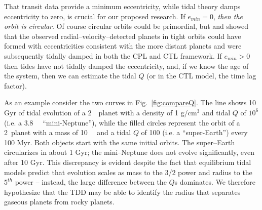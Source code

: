 \medskip
{\centerline{}}
\smallskip

That transit data provide a minimum eccentricity, while tidal theory
damps eccentricity to zero, is crucial for our proposed research. If
$e_{min} = 0$, \textit{then the orbit is circular}.  Of course
circular orbits could be primordial, but \cite{Jackson08}
and \cite{Matsumura10} showed that the observed
radial--velocity--detected planets in tight orbits could have formed
with eccentricities consistent with the more distant planets and were
subsequently tidally damped in both the CPL and CTL framework.  If
$e_{min} > 0$ then tides have not tidally damped the eccentricity,
and, if we know the age of the system, then we can estimate the tidal
$Q$ (or in the CTL model, the time lag factor).

As an example consider the two curves in Fig.~\ref{fig:compareQ}.  The
line shows 10 Gyr of tidal evolution of a 2~\rearth~planet with a
density of 1 g/cm$^3$ and tidal $Q$ of $10^6$ (i.e. a 3.8~\mearth~
``mini-Neptune''), while the filled circles represent the orbit of a
2~\rearth planet with a mass of 10~\mearth~ and a tidal $Q$ of 100
(i.e. a ``super-Earth'') every 100 Myr.  Both objects start with the same initial orbits.  The super--Earth circularizes in
about 1 Gyr; the mini--Neptune does not evolve significantly, even
after 10 Gyr.  This discrepancy is evident despite the fact that
equilibrium tidal models predict that evolution scales as mass to the
3/2 power and radius to the $5^{th}$ power -- instead, the large
difference between the $Q$s dominates.  We therefore hypothesize that
the TDD may be able to identify the radius that separates gaseous
planets from rocky planets.

